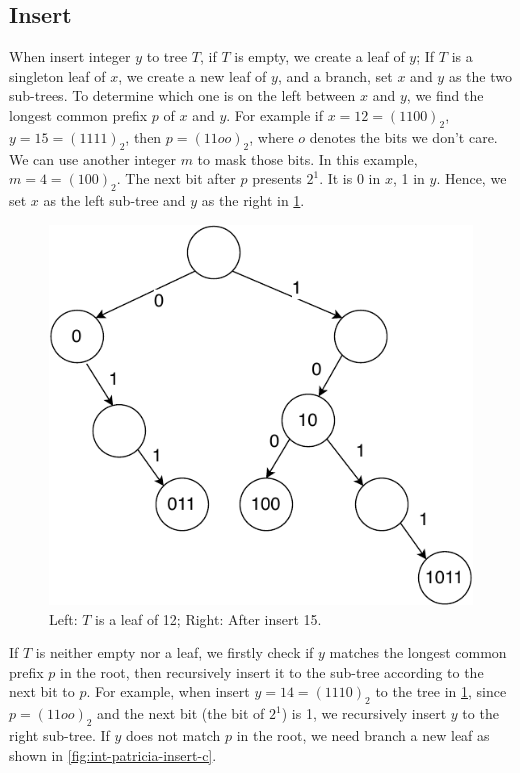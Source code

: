 \documentclass[b5paper]{article}
\begin{document}
\subsection{Insert}
When insert integer $y$ to tree $T$, if $T$ is empty, we create a leaf of $y$; If $T$ is a singleton leaf of $x$, we create a new leaf of $y$, and a branch, set $x$ and $y$ as the two sub-trees. To determine which one is on the left between $x$ and $y$, we find the longest common prefix $p$ of $x$ and $y$. For example if $x = 12 = (1100)_2$, $y = 15 = (1111)_2$, then $p = (11oo)_2$, where $o$ denotes the bits we don't care. We can use another integer $m$ to mask those bits. In this example, $m = 4 = (100)_2$. The next bit after $p$ presents $2^1$. It is 0 in $x$, 1 in $y$. Hence, we set $x$ as the left sub-tree and $y$ as the right in \cref{fig:int-patricia-insert-b}.

\begin{figure}[htbp]
  \centering
  \includegraphics[scale=0.6, page=5]{img/trie}
  \caption{Left: $T$ is a leaf of 12; Right: After insert 15.}
  \label{fig:int-patricia-insert-b}
\end{figure}

If $T$ is neither empty nor a leaf, we firstly check if $y$ matches the longest common prefix $p$ in the root, then recursively insert it to the sub-tree according to the next bit to $p$. For example, when insert $y = 14 = (1110)_2$ to the tree in \cref{fig:int-patricia-insert-b}, since $p = (11oo)_2$ and the next bit (the bit of $2^1$) is 1, we recursively insert $y$ to the right sub-tree. If $y$ does not match $p$ in the root, we need branch a new leaf as shown in \cref{fig:int-patricia-insert-c}.
\end{document}
